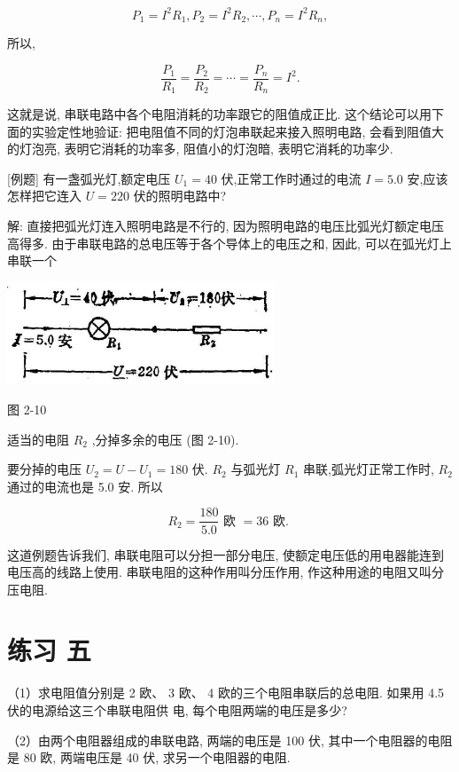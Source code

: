 \documentclass[10pt]{article}
\begin{document}
\[
{P}_{1} = {I}^{2}{R}_{1},{P}_{2} = {I}^{2}{R}_{2},\cdots ,{P}_{n} = {I}^{2}{R}_{n},
\]

所以,

\[
\frac{{P}_{1}}{{R}_{1}} = \frac{{P}_{2}}{{R}_{2}} = \cdots = \frac{{P}_{n}}{{R}_{n}} = {I}^{2}.
\]

这就是说, 串联电路中各个电阻消耗的功率跟它的阻值成正比. 这个结论可以用下面的实验定性地验证: 把电阻值不同的灯泡串联起来接入照明电路, 会看到阻值大的灯泡亮, 表明它消耗的功率多, 阻值小的灯泡暗, 表明它消耗的功率少.

[例题] 有一盏弧光灯,额定电压 \({U}_{1} = {40}\) 伏,正常工作时通过的电流 \(I = {5.0}\) 安,应该怎样把它连入 \(U = {220}\) 伏的照明电路中?

解: 直接把弧光灯连入照明电路是不行的, 因为照明电路的电压比弧光灯额定电压高得多. 由于串联电路的总电压等于各个导体上的电压之和, 因此, 可以在弧光灯上串联一个

\begin{center}
\includegraphics[max width=0.6\textwidth]{images/01913056-1f15-74d8-9184-9aab52c9d66b_75_949901.jpg}
\end{center}

图 2-10

适当的电阻 \({R}_{2}\) ,分掉多余的电压 (图 2-10).

要分掉的电压 \({U}_{2} = U - {U}_{1} = {180}\) 伏. \({R}_{2}\) 与弧光灯 \({R}_{1}\) 串联,弧光灯正常工作时, \({R}_{2}\) 通过的电流也是 5.0 安. 所以

\[
{R}_{2} = \frac{180}{5.0}\text{ 欧 } = {36}\text{ 欧. }
\]

这道例题告诉我们, 串联电阻可以分担一部分电压, 使额定电压低的用电器能连到电压高的线路上使用. 串联电阻的这种作用叫分压作用, 作这种用途的电阻又叫分压电阻.

\section*{练习 五}

（1）求电阻值分别是 2 欧、 3 欧、 4 欧的三个电阻串联后的总电阻. 如果用 4.5 伏的电源给这三个串联电阻供 电, 每个电阻两端的电压是多少?

（2）由两个电阻器组成的串联电路, 两端的电压是 100 伏, 其中一个电阻器的电阻是 80 欧, 两端电压是 40 伏, 求另一个电阻器的电阻.
\end{document}
